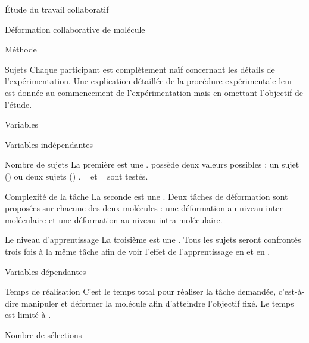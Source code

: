 \documentclass[myfrancais]{mythesis}
\begin{document}
\begin{mypart}{Étude du travail collaboratif}
\begin{mychapter}{Déformation collaborative de molécule}
\begin{mysection}{Méthode}
\begin{mysubsection}{Sujets}
					Chaque participant est complètement naïf concernant les détails de l'expérimentation.
					Une explication détaillée de la procédure expérimentale leur est donnée au commencement de l'expérimentation mais en omettant l'objectif de l'étude.
				\end{mysubsection}
				\begin{mysubsection}{Variables}
					\begin{mysubsubsection}{Variables indépendantes}
						\begin{myparagraph}{ Nombre de sujets}
							La première  est une .
							 possède deux valeurs possibles : \og un sujet (\mycf {}) \fg ou \og deux sujets (\mycf {}) \fg.
							\mynum{12}~ et ~ sont testés.
						\end{myparagraph}
						\begin{myparagraph}{ Complexité de la tâche}
							La seconde  est une .
							Deux tâches de déformation sont proposées sur chacune des deux molécules : une déformation au niveau inter-moléculaire et une déformation au niveau intra-moléculaire.
						\end{myparagraph}
						\begin{myparagraph}{ Le niveau d'apprentissage}
							La troisième  est une .
							Tous les sujets seront confrontés trois fois à la même tâche afin de voir l'effet de l'apprentissage en  et en .
						\end{myparagraph}
					\end{mysubsubsection}
					\begin{mysubsubsection}{Variables dépendantes}
						\begin{myparagraph}{ Temps de réalisation}
							C'est le temps total pour réaliser la tâche demandée, c'est-à-dire manipuler et déformer la molécule afin d'atteindre l'objectif fixé.
							Le temps est limité à .
						\end{myparagraph}
						\begin{myparagraph}{ Nombre de sélections}

\end{myparagraph}
\end{mysubsubsection}
\end{mysubsection}
\end{mysection}
\end{mychapter}
\end{mypart}
\end{document}
